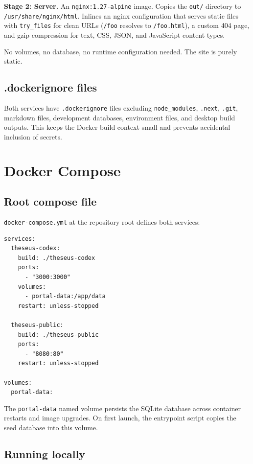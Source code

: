 \documentclass[11pt,letterpaper]{article}
\newcommand{\file}[1]{\texttt{#1}}
\newcommand{\cmd}[1]{\texttt{#1}}
\begin{document}
\textbf{Stage 2: Server.} An \cmd{nginx:1.27-alpine} image. Copies the \file{out/} directory to \file{/usr/share/nginx/html}. Inlines an nginx configuration that serves static files with \cmd{try\_files} for clean URLs (\file{/foo} resolves to \file{/foo.html}), a custom 404 page, and gzip compression for text, CSS, JSON, and JavaScript content types.

No volumes, no database, no runtime configuration needed. The site is purely static.

\subsection{.dockerignore files}

Both services have \file{.dockerignore} files excluding \file{node\_modules}, \file{.next}, \file{.git}, markdown files, development databases, environment files, and desktop build outputs. This keeps the Docker build context small and prevents accidental inclusion of secrets.

\section{Docker Compose}

\subsection{Root compose file}

\file{docker-compose.yml} at the repository root defines both services:

\begin{lstlisting}
services:
  theseus-codex:
    build: ./theseus-codex
    ports:
      - "3000:3000"
    volumes:
      - portal-data:/app/data
    restart: unless-stopped

  theseus-public:
    build: ./theseus-public
    ports:
      - "8080:80"
    restart: unless-stopped

volumes:
  portal-data:
\end{lstlisting}

The \cmd{portal-data} named volume persists the SQLite database across container restarts and image upgrades. On first launch, the entrypoint script copies the seed database into this volume.

\subsection{Running locally}
\end{document}
